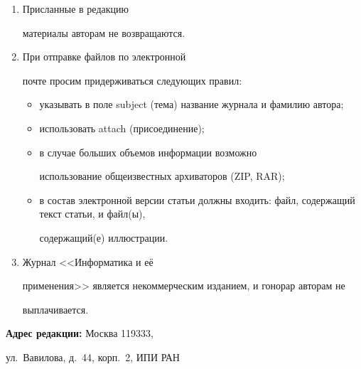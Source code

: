 {{\begin{enumerate}
литературу в тексте статьи нумеруются (в квадратных скобках) и располагаются в


порядке их первого упоминания. Все фамилии авторов, заглавия статей, названия


книг, конференций и~т.\,п.\ даются на языке оригинала, если этот язык


использует кириллический или латинский алфавит.


\item Присланные в редакцию


материалы авторам не возвращаются.


\item При отправке файлов по электронной


почте просим придерживаться следующих правил:


\begin{itemize}


\item указывать в поле subject (тема) название журнала и фамилию автора;


\item использовать attach (присоединение);


\item в случае больших объемов информации возможно


использование общеизвестных архиваторов (ZIP, RAR);


\item в состав электронной версии статьи должны входить: файл, содержащий текст статьи, и файл(ы),


содержащий(е) иллюстрации.


\end{itemize}


\item Журнал <<Информатика и её


применения>> является некоммерческим изданием, и гонорар авторам не


выплачивается.


\end{enumerate}


\thispagestyle{empty}





\medskip


\noindent


\textbf{Адрес редакции:} Москва 119333,


ул.~Вавилова, д.~44, корп.~2, ИПИ РАН\\


}}
